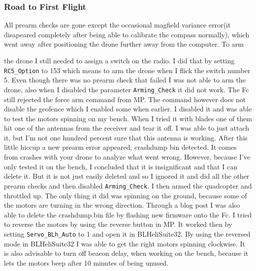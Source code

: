\documentclass{article}
\begin{document}
	\subsubsection{Road to First Flight}
	All prearm checks are gone except the occasional magfield variance error(it disapeared completely after being able to calibrate the compass normally), which went away after positioning the drone further away from the computer. To arm
	\begin{Explanation}[to arm]
		
	\end{Explanation}
	the drone I still needed to assign a switch on the radio. I did that by setting \lstinline|RC5_Option| to 153 which means to arm the drone when I flick the switch number 5. Even though there was no prearm check that failed I was not able to arm the drone, also when I disabled the parameter \lstinline|Arming_Check| it did not work. The Fc still rejected the force arm command from MP. The command however does not disable the geofence which I enabled some when earlier. I disabled it and was able to test the motors spinning on my bench. When I tried it with blades one of them hit one of the antennas from the receiver and tear it off. I was able to just attach it, but I'm not one hundred percent sure that this antenna is working. After this little hiccup a new prearm error appeared, crashdump bin detected. It comes from crashes with your drone to analyze what went wrong. 
	However, because I've only tested it on the bench, I concluded that it is insignificant and that I can delete it. But it is not just easily deleted and so I ignored it and did all the other prearm checks and then disabled \lstinline|Arming_Check|. I then armed the quadcopter and throttled up. The only thing it did was spinning on the ground, because some of the motors are turning in the wrong direction. Through a blog post\cite{blogcrashdump} I was also able to delete the crashdump.bin file by flashing new firmware onto the Fc. I tried to reverse the motors by using the reverse button in MP. It worked then by setting \lstinline|Servo_BLh_Auto| to 1 and open it in BLHeliSuite32\cite{BLHeliSuite32}. By using the reversed mode in BLHeliSuite32 I was able to get the right motors spinning clockwise. It is also advisable to turn off beacon delay, when working on the bench, because it lets the motors beep after 10 minutes of being unused.
	
\end{document}
